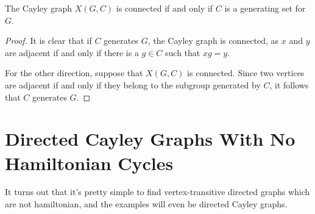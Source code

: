 
\begin{lemma}
	The Cayley graph $X(G,C)$ is connected if and only if $C$ is a generating set for $G$.
\end{lemma}

\begin{proof}
	It is clear that if $C$ generates $G$, the Cayley graph is connected, as $x$ and $y$ are adjacent if and only if there is a $g\in C$ such that $xg=y$.
	
	For the other direction, suppose that $X(G,C)$ is connected.  Since two vertices are adjacent if and only if they belong to the subgroup generated by $C$, it follows that $C$ generates $G$.
\end{proof}



\section*{Directed Cayley Graphs With No Hamiltonian Cycles}

It turns out that it's pretty simple to find vertex-transitive directed graphs which are not hamiltonian, and the examples will even be directed Cayley graphs.

